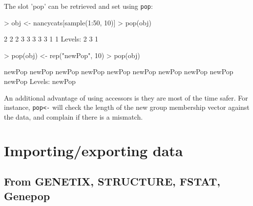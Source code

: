 \documentclass{article}
\begin{document}
\noindent The slot 'pop' can be retrieved and set using \texttt{pop}:
\begin{Schunk}
\begin{Sinput}
> obj <- nancycats[sample(1:50, 10)]
> pop(obj)
\end{Sinput}
\begin{Soutput}
 [1] 2 2 2 3 3 3 3 3 1 1
Levels: 2 3 1
\end{Soutput}
\begin{Sinput}
> pop(obj) <- rep("newPop", 10)
> pop(obj)
\end{Sinput}
\begin{Soutput}
 [1] newPop newPop newPop newPop newPop newPop newPop newPop newPop newPop
Levels: newPop
\end{Soutput}
\end{Schunk}
An additional advantage of using accessors is they are most of the time safer. For instance,
\texttt{pop<-} will check the length of the new group membership vector against the data, and
complain if there is a mismatch.






\section{Importing/exporting data}


\subsection{From GENETIX, STRUCTURE, FSTAT, Genepop}
\end{document}
